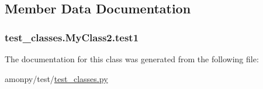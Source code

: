 \subsection{Member Data Documentation}
\hypertarget{classtest__classes_1_1_my_class2_aa8869bacaa7d8d98ba83bcfedd5bab49}{
\subsubsection[{test1}]{\setlength{\rightskip}{0pt plus 5cm}test\-\_\-classes.\-My\-Class2.\-test1}}\label{classtest__classes_1_1_my_class2_aa8869bacaa7d8d98ba83bcfedd5bab49}


The documentation for this class was generated from the following file\-:\begin{DoxyCompactItemize}
\item 
amonpy/test/\hyperlink{test__classes_8py}{test\-\_\-classes.\-py}\end{DoxyCompactItemize}
